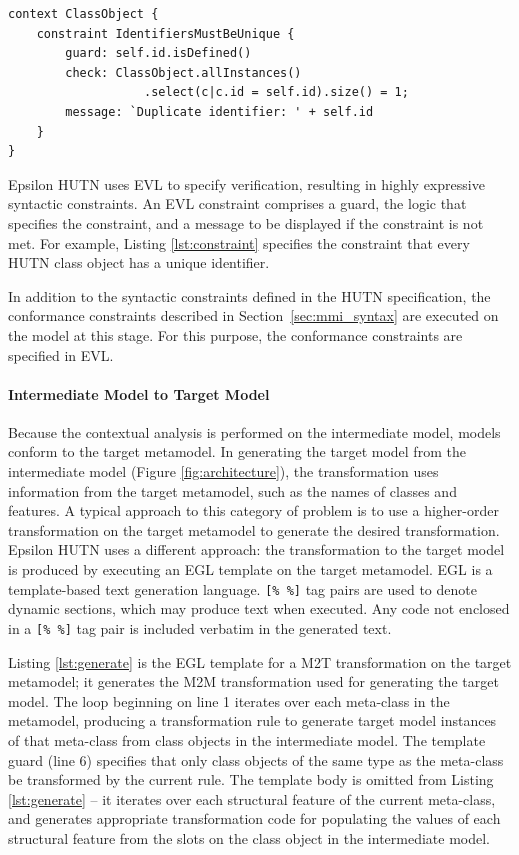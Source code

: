 \begin{lstlisting}[caption=A constraint (in EVL) to check that all identifiers are unique., label=lst:constraint, language=EVL]
context ClassObject {
    constraint IdentifiersMustBeUnique {
        guard: self.id.isDefined()
        check: ClassObject.allInstances()
                   .select(c|c.id = self.id).size() = 1;
        message: `Duplicate identifier: ' + self.id
    }
}
\end{lstlisting}

Epsilon HUTN uses EVL \cite{kolovos08evl} to specify verification, resulting in highly expressive syntactic constraints. An EVL constraint comprises a guard, the logic that specifies the constraint, and a message to be displayed if the constraint is not met. For example, Listing \ref{lst:constraint} specifies the constraint that every HUTN class object has a unique identifier.

In addition to the syntactic constraints defined in the HUTN specification, the conformance constraints described in Section~\ref{sec:mmi_syntax} are executed on the model at this stage. For this purpose, the conformance constraints are specified in EVL.

\paragraph{Intermediate Model to Target Model}
Because the contextual analysis is performed on the intermediate model, models conform to the target metamodel. In generating the target model from the intermediate model (Figure \ref{fig:architecture}), the transformation uses information from the target metamodel, such as the names of classes and features. A typical approach to this category of problem is to use a higher-order transformation on the target metamodel to generate the desired transformation. Epsilon HUTN uses a different approach: the transformation to the target model is produced by executing an EGL template on the target metamodel. EGL is a template-based text generation language. \verb|[% %]| tag pairs are used to denote dynamic sections, which may produce text when executed. Any code not enclosed in a \verb|[% %]| tag pair is included verbatim in the generated text.

Listing \ref{lst:generate} is the EGL template for a M2T transformation on the target metamodel; it generates the M2M transformation used for generating the target model. The loop beginning on line 1 iterates over each meta-class in the metamodel, producing a transformation rule to generate target model instances of that meta-class from class objects in the intermediate model. The template guard (line 6) specifies that only class objects of the same type as the meta-class be transformed by the current rule. The template body is omitted from Listing \ref{lst:generate} -- it iterates over each structural feature of the current meta-class, and generates appropriate transformation code for populating the values of each structural feature from the slots on the class object in the intermediate model.

